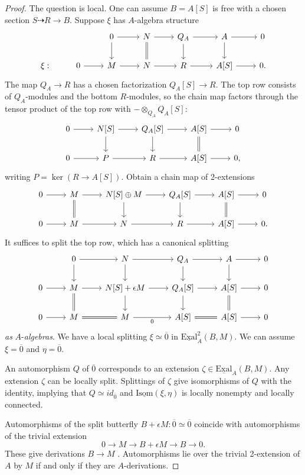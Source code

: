 \documentclass[11pt,reqno]{amsart}
\theoremstyle{definition}
\newcommand{\IIsom}{\underline{\textrm{Isom}}}
\newcommand{\EExal}{\underline{\textrm{Exal}}}
\renewcommand{\bar}[1]{\overline{#1}}
\begin{document}
\begin{proof}

The question is local. One can assume $B = A[S]$ is free with a chosen section $S \dashrightarrow R \to B$. Suppose $\xi$ has $A$-algebra structure
\[\begin{tikzcd}
 &&0 \ar[r] \ar[d]  &N \ar[r] \ar[d, equals]  &Q_A \ar[r] \ar[d]  &A \ar[r] \ar[d] &0 \\
\xi : &0 \ar[r]  &M \ar[r]  &N \ar[r]  &R \ar[r]  &A[S] \ar[r]  &0.
\end{tikzcd}\]
The map $Q_A \to R$ has a chosen factorization $Q_A[S] \to R$. The top row consists of $Q_A$-modules and the bottom $R$-modules, so the chain map factors through the tensor product of the top row with $- \otimes_{Q_A} Q_A[S]$:
\[\begin{tikzcd}
0  \ar[r] &N[S] \ar[r] \ar[d]  &Q_A[S] \ar[r] \ar[d] &A[S] \ar[r] \ar[d, equals] &0 \\
0 \ar[r]  &P  \ar[r] &R  \ar[r] &A[S] \ar[r]  &0,
\end{tikzcd}\]
writing $P = \ker (R \to A[S])$. Obtain a chain map of 2-extensions
\[\begin{tikzcd}
0  \ar[r] &M \ar[r] \ar[d, equals]  &N[S] \oplus M \ar[r] \ar[d]  &Q_A[S] \ar[r] \ar[d]  &A[S] \ar[r] \ar[d, equals]  &0 \\
0 \ar[r]  &M \ar[r]  &N \ar[r]  &R \ar[r]  &A[S] \ar[r]  &0.
\end{tikzcd}\]
It suffices to split the top row, which has a canonical splitting 
\[\begin{tikzcd}
 &0 \ar[r] \ar[d]  &N \ar[r] \ar[d]  &Q_A \ar[r] \ar[d]  &A  \ar[r] \ar[d] &0 \\
0 \ar[r]  &M \ar[r] \ar[d, equals]  &N[S] +\epsilon M \ar[r] \ar[d]  &Q_A[S] \ar[r] \ar[d]  &A[S] \ar[r] \ar[d, equals]  &0 \\
0 \ar[r]  &M \ar[r, equals]  &M \ar[r, "0", swap]  &A[S] \ar[r, equals]  &A[S] \ar[r]  &0
\end{tikzcd}\]
\emph{as} $A$-\emph{algebras}. We have a local splitting $\xi \simeq \bar 0$ in $\EExal^2_A(B, M)$. We can assume $\xi = \bar 0$ and $\eta = \bar 0$.

An automorphism $Q$ of $\bar 0$ corresponds to an extension $\zeta \in \EExal_A(B, M)$. Any extension $\zeta$ can be locally split. Splittings of $\zeta$ give isomorphisms of $Q$ with the identity, implying that $Q \simeq id_{\bar 0}$ and $\IIsom(\xi, \eta)$ is locally nonempty and locally connected. 

Automorphisms of the split butterfly $B + \epsilon M : \bar 0 \simeq \bar 0$ coincide with automorphisms of the trivial extension
\[0 \to M \to B + \epsilon M \to B \to 0.\]
These give derivations $B \to M$ \cite[4.3.4]{lichtenbaumschlessinger}. Automorphisms lie over the trivial 2-extension of $A$ by $M$ if and only if they are $A$-derivations. 

\end{proof}
\end{document}
